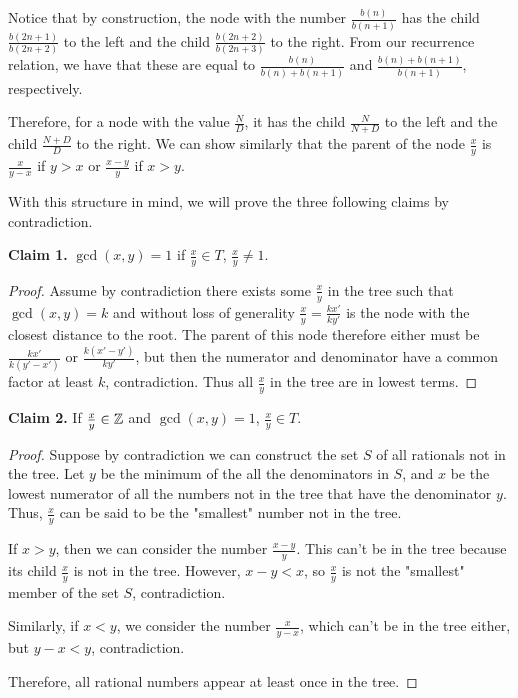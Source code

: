 \documentclass[11pt,twosided]{article}
\begin{document}
Notice that by construction, the node with the number $\frac{b(n)}{b(n+1)}$ has the child $\frac{b(2n+1)}{b(2n+2)}$ to the left and the child $\frac{b(2n+2)}{b(2n+3)}$ to the right. From our recurrence relation, we have that these are equal to $\frac{b(n)}{b(n) + b(n+1)}$ and $\frac{b(n) + b(n+1)}{b(n+1)}$, respectively.

Therefore, for a node with the value $\frac{N}{D}$, it has the child $\frac{N}{N+D}$ to the left and the child $\frac{N+D}{D}$ to the right. We can show similarly that the parent of the node $\frac{x}{y}$ is $\frac{x}{y-x}$ if $y > x$ or $\frac{x-y}{y}$ if $x > y$. 

With this structure in mind, we will prove the three following claims by contradiction. 


\textbf{Claim 1.} $\gcd(x, y) = 1$ if $ \frac{x}{y} \in T$, $\frac{x}{y} \neq 1$. 
\begin{proof}
	Assume by contradiction there exists some $\frac{x}{y}$ in the tree such that $\gcd(x, y) = k$ and without loss of generality $\frac{x}{y} = \frac{kx'}{ky'}$ is the node with the closest distance to the root. The parent of this node therefore either must be $\frac{kx'}{k(y'-x')}$ or $\frac{k(x'-y')}{ky'}$, but then the numerator and denominator have a common factor at least $k$, contradiction. Thus all $\frac{x}{y}$ in the tree are in lowest terms. 	
\end{proof}

\textbf{Claim 2.} If $\frac{x}{y} \in \mathbb Z$ and $\gcd(x, y) = 1$, $ \frac{x}{y} \in T$. 
\begin{proof}
Suppose by contradiction we can construct the set $S$ of all rationals not in the tree. Let $y$ be the minimum of the all the denominators in $S$, and $x$ be the lowest numerator of all the numbers not in the tree that have the  denominator $y$. Thus, $\frac{x}{y}$ can be said to be the "smallest" number not in the tree. 

If $x > y$, then we can consider the number $\frac{x-y}{y}$. This can't be in the tree because its child $\frac{x}{y}$ is not in the tree. However, $x-y < x$, so $\frac{x}{y}$ is not the "smallest" member of the set $S$, contradiction. 

Similarly, if $x < y$, we consider the number $\frac{x}{y-x}$, which can't be in the tree either, but $y- x < y$, contradiction. 

Therefore, all rational numbers appear at least once in the tree. 
\end{proof}
\end{document}
